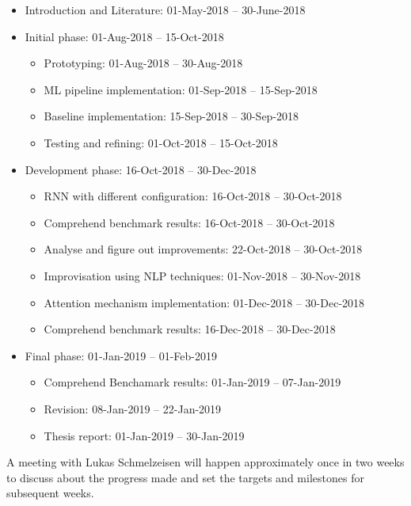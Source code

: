 \documentclass[a4paper, 11pt]{article}
\begin{document}
\begin{itemize}
	\item Introduction and Literature: 01-May-2018 – 30-June-2018
	\item Initial phase: 01-Aug-2018 – 15-Oct-2018
	\begin{itemize}
		\item Prototyping: 01-Aug-2018 – 30-Aug-2018
		\item ML pipeline implementation: 01-Sep-2018 – 15-Sep-2018
        \item Baseline implementation: 15-Sep-2018 – 30-Sep-2018
        \item Testing and refining: 01-Oct-2018 – 15-Oct-2018
	\end{itemize}
	\item Development phase: 16-Oct-2018 – 30-Dec-2018
	\begin{itemize}
		\item RNN with different configuration: 16-Oct-2018 – 30-Oct-2018
		\item Comprehend benchmark results: 16-Oct-2018 – 30-Oct-2018
		\item Analyse and figure out improvements: 22-Oct-2018 – 30-Oct-2018
        \item Improvisation using NLP techniques: 01-Nov-2018 – 30-Nov-2018
        \item Attention mechanism implementation: 01-Dec-2018 – 30-Dec-2018
        \item Comprehend benchmark results: 16-Dec-2018 – 30-Dec-2018
	\end{itemize}
	\item Final phase: 01-Jan-2019 – 01-Feb-2019
	\begin{itemize}
	 	\item Comprehend Benchamark results: 01-Jan-2019 – 07-Jan-2019
		\item Revision: 08-Jan-2019 – 22-Jan-2019
		\item Thesis report: 01-Jan-2019 – 30-Jan-2019
	\end{itemize}
\end{itemize}

A meeting with Lukas Schmelzeisen will happen approximately once in two weeks to discuss about the progress made and set the targets and milestones for subsequent weeks. 


\newpage

\newpage
\end{document}
